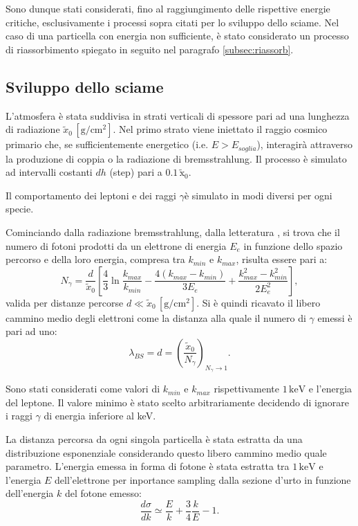 \documentclass[10pt,a4paper,usenatbib]{article}
\newcommand*{\unit}[1]{\ensuremath{\mathrm{\,#1}}}                              %
\begin{document}
Sono dunque stati considerati, fino al raggiungimento delle rispettive energie critiche, esclusivamente i processi sopra citati per lo sviluppo dello sciame. Nel caso di una particella con energia non sufficiente, è stato considerato un processo di riassorbimento spiegato in seguito nel paragrafo \ref{subsec:riassorb}. 

\subsection{Sviluppo dello sciame}
L'atmosfera è stata suddivisa in strati verticali di spessore pari ad una lunghezza di radiazione $\tilde{x}_0 \unit{[g/cm^2]}$. Nel primo strato viene iniettato il raggio cosmico primario che, se sufficientemente energetico (i.e. $E > E_{soglia}$), interagirà attraverso la produzione di coppia o la radiazione di bremsstrahlung. Il processo è simulato ad intervalli costanti $dh$ (step) pari a $0.1\unit{\tilde{x}_0}$.

Il comportamento dei leptoni e dei raggi $\gamma$è simulato in modi diversi per ogni specie.
 
Cominciando dalla radiazione bremsstrahlung, dalla letteratura \citep{PassParticMatterPDG}, si trova che il numero di fotoni prodotti da un elettrone di energia $E_e$ in funzione dello spazio percorso e della loro energia, compresa tra $k_{min}$ e $k_{max}$, risulta essere pari a: 
\begin{equation}
N_\gamma = \frac{d}{\tilde{x}_0}\left[\frac{4}{3}\ln{\frac{k_{max}}{k_{min}}}-\frac{4(k_{max} - k_{min})}{3E_e}+\frac{k_{max}^2 - k_{min}^2}{2E_e^2}\right],
\label{eq:Ngamma}
\end{equation}
valida per distanze percorse $d \ll \tilde{x}_0 \unit{[g/cm^2]}$. Si è quindi ricavato il libero cammino medio degli elettroni come la distanza alla quale il numero di $\gamma$ emessi è pari ad uno:
\begin{equation}
\lambda_{BS} = d = \left({\frac{\tilde{x}_0}{N_\gamma}}\right)_{N_\gamma \rightarrow 1}.
\label{eq:lambdaBS}
\end{equation}

Sono stati considerati come valori di $k_{min}$ e $k_{max}$ rispettivamente $1\unit{keV}$ e l'energia del leptone. Il valore minimo è stato scelto arbitrariamente decidendo di ignorare i raggi $\gamma$ di energia inferiore al keV.

La distanza percorsa da ogni singola particella è stata estratta da una distribuzione esponenziale considerando questo libero cammino medio quale parametro. L'energia emessa in forma di fotone è stata estratta tra $1 \unit{keV}$ e l'energia $E$ dell'elettrone per inportance sampling dalla sezione d'urto in funzione dell'energia $k$ del fotone emesso:
\begin{equation}
\frac{d\sigma}{dk} \simeq \frac{E}{k} + \frac 3 4 \frac{k}{E} - 1.
\label{eq:dSigma}
\end{equation}
\end{document}

